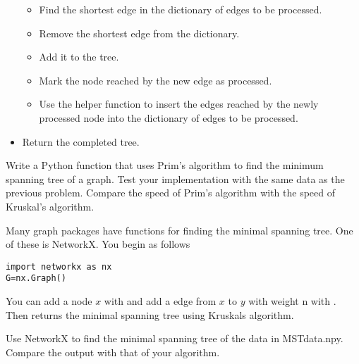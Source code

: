 \begin{itemize}
	\begin{itemize}

	\item Find the shortest edge in the dictionary of edges to be processed.

	\item Remove the shortest edge from the dictionary.

	\item Add it to the tree.

	\item Mark the node reached by the new edge as processed.

	\item Use the helper function to insert the edges reached by the newly processed node into the dictionary of edges to be processed.

	\end{itemize}

\item Return the completed tree.

\end{itemize}

\begin{problem}
Write a Python function that uses Prim's algorithm to find the minimum spanning tree of a graph.
Test your implementation with the same data as the previous problem.
Compare the speed of Prim's algorithm with the speed of Kruskal's algorithm.
\end{problem}

Many graph packages have functions for finding the minimal spanning tree. One of these is NetworkX. You begin as follows
\begin{lstlisting}
import networkx as nx
G=nx.Graph()
\end{lstlisting}
You can add a node $x$ with  and add a edge from $x$ to $y$ with weight n with . Then  returns the minimal spanning tree using Kruskals algorithm.

\begin{problem}
Use NetworkX to find the minimal spanning tree of the data in MSTdata.npy. Compare the output with that of your algorithm.
\end{problem}
